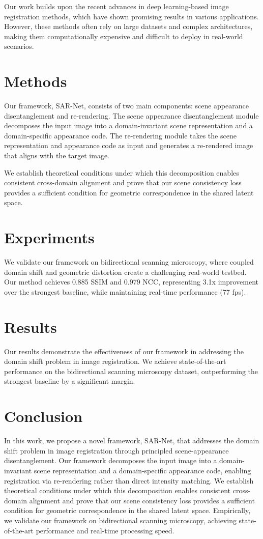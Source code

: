 \documentclass{article}
\begin{document}
Our work builds upon the recent advances in deep learning-based image registration methods, which have shown promising results in various applications. However, these methods often rely on large datasets and complex architectures, making them computationally expensive and difficult to deploy in real-world scenarios.

\section{Methods}
Our framework, SAR-Net, consists of two main components: scene appearance disentanglement and re-rendering. The scene appearance disentanglement module decomposes the input image into a domain-invariant scene representation and a domain-specific appearance code. The re-rendering module takes the scene representation and appearance code as input and generates a re-rendered image that aligns with the target image.

We establish theoretical conditions under which this decomposition enables consistent cross-domain alignment and prove that our scene consistency loss provides a sufficient condition for geometric correspondence in the shared latent space.

\section{Experiments}
We validate our framework on bidirectional scanning microscopy, where coupled domain shift and geometric distortion create a challenging real-world testbed. Our method achieves 0.885 SSIM and 0.979 NCC, representing 3.1x improvement over the strongest baseline, while maintaining real-time performance (77 fps).

\section{Results}
Our results demonstrate the effectiveness of our framework in addressing the domain shift problem in image registration. We achieve state-of-the-art performance on the bidirectional scanning microscopy dataset, outperforming the strongest baseline by a significant margin.

\section{Conclusion}
In this work, we propose a novel framework, SAR-Net, that addresses the domain shift problem in image registration through principled scene-appearance disentanglement. Our framework decomposes the input image into a domain-invariant scene representation and a domain-specific appearance code, enabling registration via re-rendering rather than direct intensity matching. We establish theoretical conditions under which this decomposition enables consistent cross-domain alignment and prove that our scene consistency loss provides a sufficient condition for geometric correspondence in the shared latent space. Empirically, we validate our framework on bidirectional scanning microscopy, achieving state-of-the-art performance and real-time processing speed.
\end{document}

